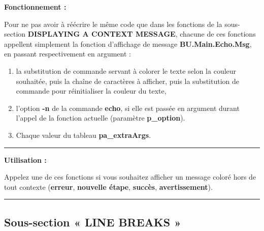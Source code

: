 \documentclass[a4paper,10pt]{article}
\begin{document}
    \begin{justify}
        \textbf{Fonctionnement :}

        Pour ne pas avoir à réécrire le même code que dans les fonctions de la sous-section \textbf{\color{sec2}DISPLAYING A CONTEXT MESSAGE}, chacune de ces fonctions appellent simplement la fonction d'affichage de message \textbf{\color{func}BU.Main.Echo.Msg}, en passant respectivement en argument :
        \begin{enumerate}
            \item la substitution de commande servant à colorer le texte selon la couleur souhaitée, puis la chaîne de caractères à afficher, puis la substitution de commande pour réinitialiser la couleur du texte,
            \item l'option \textbf{\color{cmds}-n} de la commande \textbf{\color{cmds}echo}, si elle est passée en argument durant l'appel de la fonction actuelle (paramètre \textbf{\color{vars}p\_option}).
            \item Chaque valeur du tableau \textbf{\color{vars}pa\_extraArgs}.
        \end{enumerate}
    \end{justify}


    \par\noindent\rule{\textwidth}{0.4pt}

    \begin{justify}
        \textbf{Utilisation :}

        Appelez une de ces fonctions si vous souhaitez afficher un message coloré hors de tout contexte (\textbf{\color{Red}erreur}, \textbf{\color{Orange}nouvelle étape}, \textbf{\color{Green}succès}, \textbf{\color{Yellow}avertissement}).
    \end{justify}




    \color{sec2}\par\noindent\rule{\textwidth}{0.4pt}\color{text}\setlength{\parskip}{1em}

    \color{sec2}
    \subsection{Sous-section « LINE BREAKS »}\color{text}
\end{document}

